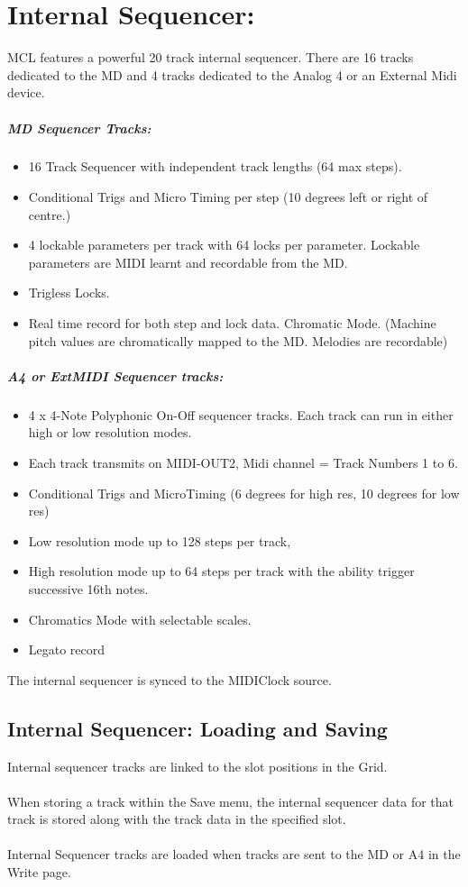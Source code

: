 \chapter{Internal Sequencer:}
MCL features a powerful 20 track internal sequencer. There are 16 tracks dedicated to the MD and 4 tracks dedicated to the Analog 4 or an External Midi device.
\paragraph{MD Sequencer Tracks:}
\begin{itemize}
\item 16 Track Sequencer with independent track lengths (64 max steps).
\item Conditional Trigs and Micro Timing per step (10 degrees left or right of centre.)
\item 4 lockable parameters per track with 64 locks per parameter. Lockable parameters are MIDI learnt and recordable from the MD.
\item Trigless Locks.
\item Real time record for both step and lock data.
Chromatic Mode. (Machine pitch values are chromatically mapped to the MD. Melodies are recordable)
\end{itemize}
\paragraph{A4 or ExtMIDI Sequencer tracks:}
\begin{itemize}
\item 4 x 4-Note Polyphonic On-Off sequencer tracks. Each track can run in either high or low resolution modes. 
\item Each track transmits on MIDI-OUT2, Midi channel = Track Numbers 1 to 6.
\item Conditional Trigs and MicroTiming (6 degrees for high res, 10 degrees for low res)
\item Low resolution mode up to 128 steps per track,
\item High resolution mode up to 64 steps per track with the ability trigger successive 16th notes.
\item Chromatics Mode with selectable scales.
\item Legato record
\end{itemize}
The internal sequencer is synced to the MIDIClock source.
\\
\section{Internal Sequencer: Loading and Saving}
Internal sequencer tracks are linked to the slot positions in the Grid.\\
\\
When storing a track within the Save menu, the internal sequencer data for that track is stored along with the track data in the specified slot.\\
\\
Internal Sequencer tracks are loaded when tracks are sent to the MD or A4 in the Write page.

